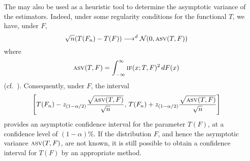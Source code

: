 The  may also be used as a heuristic tool to determine the
asymptotic variance of the estimators. Indeed, under some regularity conditions
for the functional $T$, we have, under $F$,                                     
\[
    \sqrt{n}\left(T(F_n) - T(F)\right) \longrightarrow^d \mathcal{N}\left(0, \stsc{ASV}(T, F)\right)
\]
where
\begin{equation}\label{eq:ASV}
    \stsc{ASV}(T, F) = \int_{-\infty}^\infty \stsc{IF}(x; T, F)^2 \dif F(x)
\end{equation}
(cf.\ \citealp[p. 85 and 226]{hampel:etal:1986}). Consequently, under $F$, the
interval
\[
    \left[ T(F_n) - z_{(1-\alpha/2)} \frac{\sqrt{\stsc{ASV}(T, F)}}{\sqrt{n}},\, 
           T(F_n) + z_{(1-\alpha/2)} \frac{\sqrt{\stsc{ASV}(T, F)}}{\sqrt{n}}\right]
\]
provides an asymptotic confidence interval for the parameter $T(F)$, at a
confidence level of $(1-\alpha)$\%. If the distribution $F$, and hence the
asymptotic variance $\stsc{ASV}(T, F)$, are not known, it is still possible to
obtain a confidence interval for $T(F)$ by an appropriate  method.

